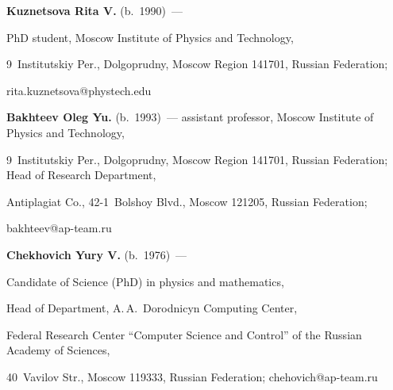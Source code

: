 \Contr





\noindent


\textbf{Kuznetsova Rita V.} (b.\ 1990)~--- 


PhD student, Moscow Institute of Physics and Technology, 


9~Institutskiy Per., Dolgoprudny, Moscow Region 141701, Russian Federation; 


\mbox{rita.kuznetsova@phystech.edu}





\vspace*{3pt}





\noindent


\textbf{Bakhteev Oleg Yu.} (b.\ 1993)~--- assistant professor, Moscow Institute of Physics and Technology, 


9~Institutskiy Per., Dolgoprudny, Moscow Region 141701, Russian Federation; Head of Research Department, 


Antiplagiat Co., 42-1~Bolshoy Blvd., Moscow 121205, Russian Federation;


\mbox{bakhteev@ap-team.ru}





\vspace*{3pt}





\noindent


\textbf{Chekhovich Yury V.} (b.\ 1976)~--- 


Candidate of Science (PhD) in physics and mathematics, 


Head of Department, A.\,A.~Dorodnicyn Computing Center, 


Federal Research Center ``Computer Science and Control'' of the Russian Academy of Sciences, 


40~Vavilov Str., Moscow 119333, Russian Federation; \mbox{chehovich@ap-team.ru}





\label{end\stat}





\renewcommand{\bibname}{\protect\rm Литература}


